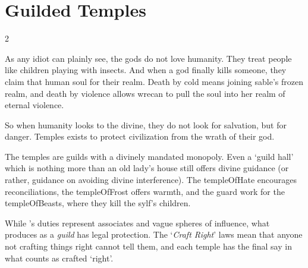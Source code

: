 \chapter{Guilded Temples}
\label{cosmology}

\newcommand\guildRank[1]{\item[#1]}

\begin{multicols}{2}

\label{godsOfDeath}

\noindent
As any idiot can plainly see, the gods do not love humanity.
They treat people like children playing with insects.
And when a god finally kills someone, they claim that human soul for their realm.
Death by cold means joining \gls{sable}'s frozen realm, and death by violence allows \gls{wrecan} to pull the soul into her realm of eternal violence.

So when humanity looks to the divine, they do not look for salvation, but for danger.
Temples exists to protect civilization from the wrath of their god.

The temples are guilds with a divinely mandated monopoly.
Even a `guild hall' which is nothing more than an old lady's house still offers divine guidance (or rather, guidance on avoiding divine interference).
The \gls{templeOfHate} encourages reconciliations, the \gls{templeOfFrost} offers warmth, and the \gls{guard} work for the \gls{templeOfBeasts}, where they kill the \gls{sylf}'s children.

While 's duties represent associates and vague spheres of influence, what  produces as a \emph{guild} has legal protection.
The `\textit{Craft Right}' laws mean that anyone not crafting things right cannot tell them, and each \gls{temple} has the final say in what counts as crafted `right'.

\newcommand\guild[7]{
  \renewcommand\npcsymbol{\glsentrysymbol{#1}}
  \needspace{16em}
  \subsection{The Temple of #2}
  \gdef\subsectionList{}
  \gappto{\sectionList}{#2~\flourish~}%
  \index{Gods}
  \label{god:#2}

  \begin{exampletext}
  #3
  \end{exampletext}

  \paragraph{God:} \glsfmtname{#1}

}
\end{multicols}
